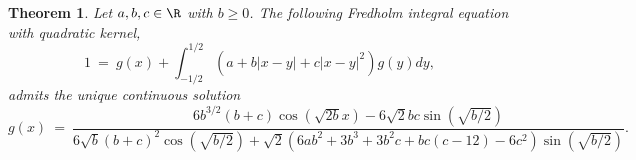 \documentclass[12pt, reqno]{amsart}
\numberwithin{equation}{section}
\newtheorem{theorem}{Theorem}
\theoremstyle{definition}
\theoremstyle{remark}
\begin{document}
\begin{theorem}
	Let $a, b, c \in \R$ with $b \geq 0$. The following Fredholm integral equation with quadratic kernel,
		\begin{equation}
			1 \ = \  g(x) + \int_{-1/2}^{1/2} (a + b |x - y| + c |x - y|^2) g(y) dy, 	\label{eq:fredholmquad}
		\end{equation}
	admits the unique continuous solution
		\begin{equation}
			g(x) \ = \  \frac{6b^{3/2} (b + c) \cos(\sqrt{2b} x) - 6 \sqrt{2} b c \sin(\sqrt{b/2})}{6 \sqrt{b} (b + c)^2 \cos(\sqrt{b/2}) + \sqrt{2} (6 a b^2 + 3b^3 + 3b^2 c + b c (c - 12) - 6c^2) \sin (\sqrt{b/2})}. \label{eq:quadsol}
		\end{equation}\label{thm:quadratic}	
\end{theorem}
\end{document}
